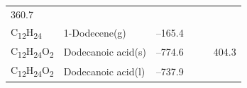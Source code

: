 \documentclass[
  9pt,
]{extbook}
\theoremstyle{definition}
\theoremstyle{definition}
\theoremstyle{definition}
\theoremstyle{remark}
\begin{document}
\begin{longtable}[]{@{}llllll@{}}
\begin{minipage}[t]{0.14\columnwidth}
360.7\strut
\end{minipage}\tabularnewline
\begin{minipage}[t]{0.07\columnwidth}\raggedright
C\textsubscript{12}H\textsubscript{24}\strut
\end{minipage} & \begin{minipage}[t]{0.17\columnwidth}\raggedright
1-Dodecene(g)\strut
\end{minipage} & \begin{minipage}[t]{0.15\columnwidth}\raggedright
--165.4\strut
\end{minipage} & \begin{minipage}[t]{0.15\columnwidth}\raggedright
\strut
\end{minipage} & \begin{minipage}[t]{0.14\columnwidth}\raggedright
\strut
\end{minipage} & \begin{minipage}[t]{0.14\columnwidth}\raggedright
\strut
\end{minipage}\tabularnewline
\begin{minipage}[t]{0.07\columnwidth}\raggedright
C\textsubscript{12}H\textsubscript{24}O\textsubscript{2}\strut
\end{minipage} & \begin{minipage}[t]{0.17\columnwidth}\raggedright
Dodecanoic acid(s)\strut
\end{minipage} & \begin{minipage}[t]{0.15\columnwidth}\raggedright
--774.6\strut
\end{minipage} & \begin{minipage}[t]{0.15\columnwidth}\raggedright
\strut
\end{minipage} & \begin{minipage}[t]{0.14\columnwidth}\raggedright
\strut
\end{minipage} & \begin{minipage}[t]{0.14\columnwidth}\raggedright
404.3\strut
\end{minipage}\tabularnewline
\begin{minipage}[t]{0.07\columnwidth}\raggedright
C\textsubscript{12}H\textsubscript{24}O\textsubscript{2}\strut
\end{minipage} & \begin{minipage}[t]{0.17\columnwidth}\raggedright
Dodecanoic acid(l)\strut
\end{minipage} & \begin{minipage}[t]{0.15\columnwidth}\raggedright
--737.9\strut
\end{minipage} & \begin{minipage}[t]{0.15\columnwidth}\raggedright

\end{minipage}
\end{longtable}
\end{document}

